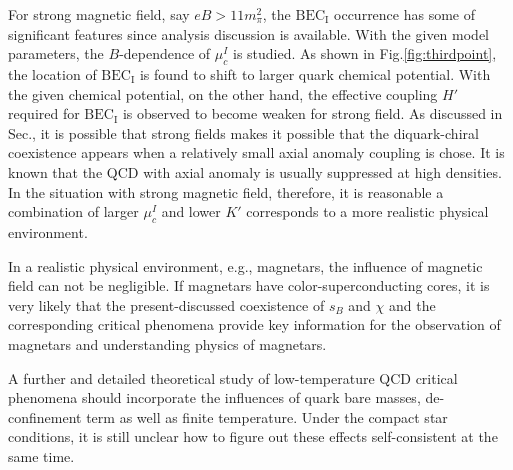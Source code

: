\documentclass[prd, showpacs,nofootinbib,amsmath,amssymb,12pt]{revtex4}
\begin{document}
 For strong magnetic field, say $eB > 11m_\pi^2$, the $\text{BEC}_\text{I}$ occurrence has some of significant features since analysis discussion is available.
  With the given model parameters, the $B$-dependence of $\mu_c^{I}$ is studied.
 As shown in Fig.\ref{fig:thirdpoint}, the location of $\text{BEC}_\text{I}$ is found to shift to larger quark chemical potential.
 With the given chemical potential, on the other hand, the effective coupling $H'$ required for $\text{BEC}_\text{I}$
  is observed to become weaken for strong field.
 As discussed in Sec., it is possible that strong fields makes it possible that the diquark-chiral coexistence appears when a relatively small axial anomaly coupling is chose.
It is known that the QCD with axial anomaly is usually suppressed at high densities.
In the situation with strong magnetic field, therefore, it is reasonable  a combination of  larger $\mu_c^I$ and  lower $K'$ corresponds to a more realistic physical environment.

In a realistic physical environment, e.g., magnetars, the influence of magnetic field
 can not be negligible.
If magnetars have color-superconducting cores, it is very likely that the present-discussed coexistence of $s_B$ and $\chi$ and the corresponding
critical phenomena provide key information for the observation of magnetars and understanding physics of magnetars.

A  further and detailed theoretical study of low-temperature QCD critical phenomena should incorporate the influences of quark bare masses, de-confinement term as well as finite temperature.
Under the compact star conditions, it is still unclear how to figure out these effects self-consistent at the same time.




\end{document}
